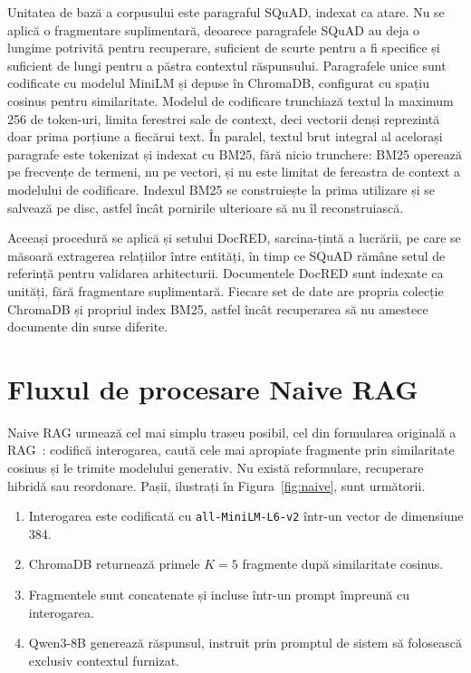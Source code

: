Unitatea de bază a corpusului este paragraful SQuAD, indexat ca atare. Nu se aplică o fragmentare suplimentară, deoarece paragrafele SQuAD au deja o lungime potrivită pentru recuperare, suficient de scurte pentru a fi specifice și suficient de lungi pentru a păstra contextul răspunsului. Paragrafele unice sunt codificate cu modelul MiniLM și depuse în ChromaDB, configurat cu spațiu cosinus pentru similaritate. Modelul de codificare trunchiază textul la maximum 256 de token-uri, limita ferestrei sale de context, deci vectorii denși reprezintă doar prima porțiune a fiecărui text. În paralel, textul brut integral al acelorași paragrafe este tokenizat și indexat cu BM25, fără nicio trunchere: BM25 operează pe frecvențe de termeni, nu pe vectori, și nu este limitat de fereastra de context a modelului de codificare. Indexul BM25 se construiește la prima utilizare și se salvează pe disc, astfel încât pornirile ulterioare să nu îl reconstruiască.

Aceeași procedură se aplică și setului DocRED, sarcina-țintă a lucrării, pe care se măsoară extragerea relațiilor între entități, în timp ce SQuAD rămâne setul de referință pentru validarea arhitecturii. Documentele DocRED sunt indexate ca unități, fără fragmentare suplimentară. Fiecare set de date are propria colecție ChromaDB și propriul index BM25, astfel încât recuperarea să nu amestece documente din surse diferite.

\section{Fluxul de procesare Naive RAG}

Naive RAG urmează cel mai simplu traseu posibil, cel din formularea originală a RAG~\cite{lewis2020rag}: codifică interogarea, caută cele mai apropiate fragmente prin similaritate cosinus și le trimite modelului generativ. Nu există reformulare, recuperare hibridă sau reordonare. Pașii, ilustrați în Figura~\ref{fig:naive}, sunt următorii.

\begin{enumerate}
    \item Interogarea este codificată cu \texttt{all-MiniLM-L6-v2} într-un vector de dimensiune 384.
    \item ChromaDB returnează primele $K=5$ fragmente după similaritate cosinus.
    \item Fragmentele sunt concatenate și incluse într-un prompt împreună cu interogarea.
    \item Qwen3-8B generează răspunsul, instruit prin promptul de sistem să folosească exclusiv contextul furnizat.
\end{enumerate}

